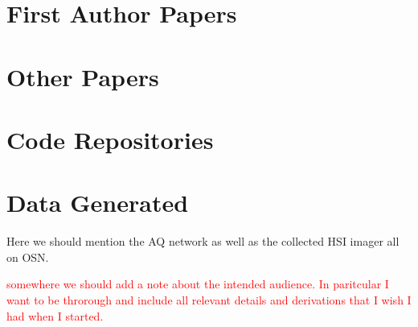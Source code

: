 \section{First Author Papers}
\section{Other Papers}
\section{Code Repositories}
\section{Data Generated}
Here we should mention the AQ network as well as the collected HSI imager all on OSN.


\textcolor{red}{somewhere we should add a note about the intended audience. In paritcular I want to be throrough and include all relevant details and derivations that I wish I had when I started.}


